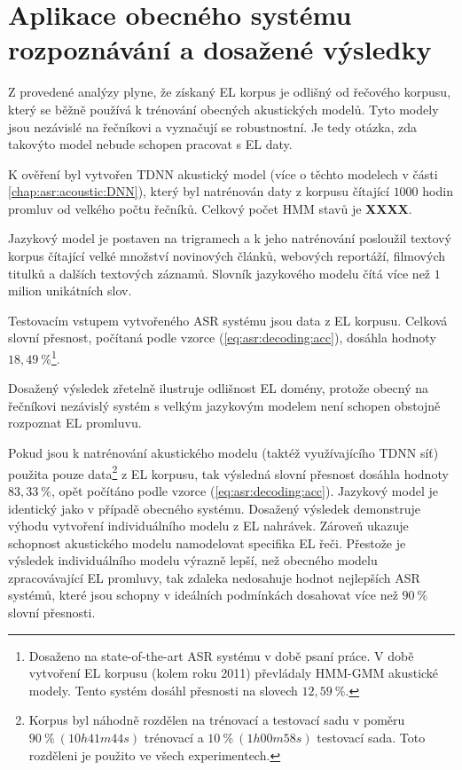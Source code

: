\section{Aplikace obecného systému rozpoznávání a dosažené výsledky}
\label{chap:construction:results}

Z provedené analýzy plyne, že získaný EL korpus je odlišný od  řečového korpusu, který se běžně používá k trénování obecných akustických modelů. Tyto modely jsou nezávislé na řečníkovi a vyznačují se robustnostní. Je tedy otázka, zda takovýto model nebude schopen pracovat s EL daty.

K ověření byl vytvořen TDNN akustický model (více o těchto modelech v části \ref{chap:asr:acoustic:DNN}), který byl natrénován daty z korpusu čítající $1000$ hodin promluv od velkého počtu řečníků. Celkový počet HMM stavů je \textbf{XXXX}.

Jazykový model je postaven na trigramech a k jeho natrénování posloužil textový korpus čítající velké množství novinových článků, webových reportáží, filmových titulků a dalších textových záznamů. Slovník jazykového modelu čítá více než $1$ milion unikátních slov.

Testovacím vstupem vytvořeného ASR systému jsou data z EL korpusu. Celková slovní přesnost, počítaná podle vzorce (\ref{eq:asr:decoding:acc}), dosáhla hodnoty $18,49\ \%$\footnote{Dosaženo na state-of-the-art ASR systému v době psaní práce. V době vytvoření EL korpusu (kolem roku 2011) převládaly HMM-GMM akustické modely. Tento systém dosáhl přesnosti na slovech $12,59\ \%$.}.

Dosažený výsledek zřetelně ilustruje odlišnost EL domény, protože obecný na řečníkovi nezávislý systém s velkým jazykovým modelem není schopen obstojně rozpoznat EL promluvu.

Pokud jsou k natrénování akustického modelu (taktéž využívajícího TDNN síť) použita pouze data\footnote{Korpus byl náhodně rozdělen na trénovací a testovací sadu v poměru $90\ \%\ (10h41m44s)$ trénovací a $10\ \%\ (1h00m58s)$ testovací sada. Toto rozděleni je použito ve všech experimentech.} z EL korpusu, tak výsledná slovní přesnost dosáhla hodnoty $83,33\ \%$, opět počítáno podle vzorce (\ref{eq:asr:decoding:acc}). Jazykový model je identický jako v případě obecného systému. Dosažený výsledek demonstruje výhodu vytvoření individuálního modelu z EL nahrávek. Zároveň ukazuje schopnost akustického modelu namodelovat specifika EL řeči. Přestože je výsledek individuálního modelu výrazně lepší, než obecného modelu zpracovávající EL promluvy, tak zdaleka nedosahuje hodnot nejlepších ASR systémů, které jsou schopny v ideálních podmínkách dosahovat více než $90\ \%$ slovní přesnosti.


